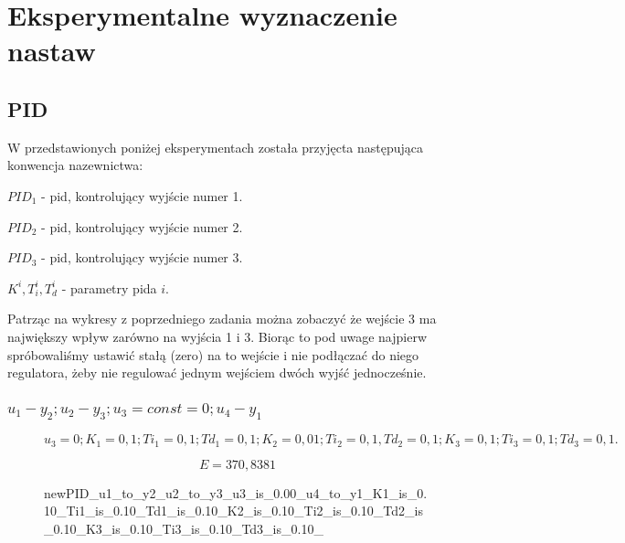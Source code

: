 \chapter{Eksperymentalne wyznaczenie nastaw}

\section{PID}
W przedstawionych poniżej eksperymentach została przyjęcta następująca konwencja nazewnictwa:

$PID_1$ - pid, kontrolujący wyjście numer 1.

\smallskip

$PID_2$ - pid, kontrolujący wyjście numer 2.

\smallskip

$PID_3$ - pid, kontrolujący wyjście numer 3.

\smallskip

$K^i, T_i^i, T_d^i$ - parametry pida $i$.

\smallskip

Patrząc na wykresy z poprzedniego zadania można zobaczyć że wejście 3 ma największy wpływ zarówno na wyjścia 1 i 3. Biorąc to pod uwage najpierw spróbowaliśmy ustawić stałą (zero) na to wejście i nie podłączać do niego regulatora, żeby nie regulować jednym wejściem dwóch wyjść jednocześnie.

\subsection{$u_1 - y_2; u_2 - y_3; u_3 = const = 0; u_4 - y_1$}

\begin{figure}[H]
    \centering
    
    \caption{$u_3 = 0; K_1 = 0,1; Ti_1 = 0,1; Td_1 = 0,1; K_2 = 0,01; Ti_2 = 0,1, Td_2 = 0,1; K_3 = 0,1; Ti_3 = 0,1; Td_3 = 0,1.$}
\end{figure}

\begin{equation}
    E = 370,8381
\end{equation}

\begin{figure}[H]
    \centering
    
    \caption{newPID_u1_to_y2_u2_to_y3_u3_is_0.00_u4_to_y1_K1_is_0.10_Ti1_is_0.10_Td1_is_0.10_K2_is_0.10_Ti2_is_0.10_Td2_is_0.10_K3_is_0.10_Ti3_is_0.10_Td3_is_0.10_}
\end{figure}

